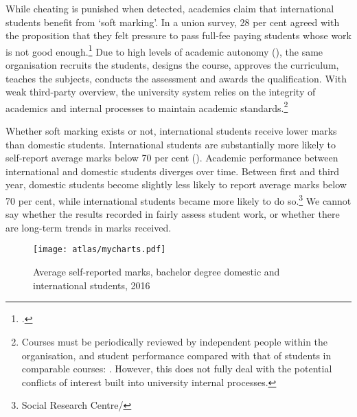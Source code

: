 \documentclass{grattan}
\begin{document}
While cheating is punished when detected, academics claim that international students benefit from `soft marking'. In a union survey, 28 per cent agreed with the proposition that they felt pressure to pass full-fee paying students whose work is not good enough.\footcite[][20]{NTEU20182017stateoftheun} Due to high levels of academic autonomy (), the same organisation recruits the students, designs the course, approves the curriculum, teaches the subjects, conducts the assessment and awards the qualification. With weak third-party overview, the university system relies on the integrity of academics and internal processes to maintain academic standards.\footnote{Courses must be periodically reviewed by independent people within the organisation, and student performance compared with that of students in comparable courses: \textcite[][]{DepartmentofEducationandTraining2015highereducationre}. However, this does not fully deal with the potential conflicts of interest built into university internal processes.}

Whether soft marking exists or not, international students receive lower marks than domestic students. International students are substantially more likely to self-report average marks below 70 per cent (). Academic performance between international and domestic students diverges over time. Between first and third year, domestic students become slightly less likely to report average marks below 70 per cent, while international students became more likely to do so.\footnote{Social Research Centre/\textcite[][]{DepartmentofEducationandTraining20182018australiancom}} We cannot say whether the results recorded in  fairly assess student work, or whether there are long-term trends in marks received.

    \begin{figure} %
    \caption{Average self-reported marks, bachelor degree domestic and international students, 2016}\label{fig:average-selfreported-marks-bachelor-degree-domestic-and-international-students-2016}
    \texttt{[image: atlas/mycharts.pdf]}
    \end{figure}
\end{document}
